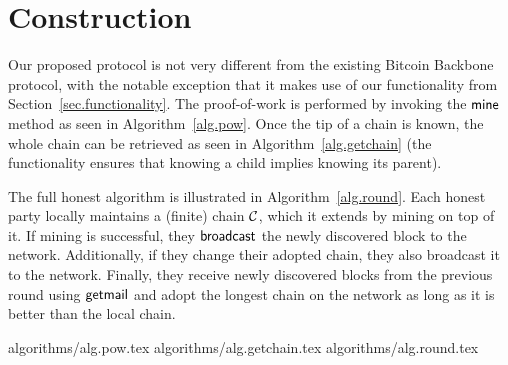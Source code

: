 \section{Construction}

Our proposed protocol is not very different from the existing Bitcoin Backbone
protocol, with the notable exception that it makes use of our functionality
from Section~\ref{sec.functionality}. The proof-of-work is performed by invoking
the $\textsf{mine}$ method as seen in Algorithm~\ref{alg.pow}. Once the tip of a chain
is known, the whole chain can be retrieved as seen in
Algorithm~\ref{alg.getchain} (the functionality ensures that knowing a child
implies knowing its parent).

The full honest algorithm is illustrated in Algorithm~\ref{alg.round}. Each
honest party locally maintains a (finite) chain $\mathcal{C}$, which it extends by
mining on top of it. If mining is successful, they $\textsf{broadcast}$ the newly
discovered block to the network. Additionally, if they change their adopted
chain, they also broadcast it to the network. Finally, they receive newly
discovered blocks from the previous round using $\textsf{getmail}$ and adopt the longest
chain on the network as long as it is better than the local chain.

{algorithms/alg.pow.tex}
{algorithms/alg.getchain.tex}
{algorithms/alg.round.tex}
